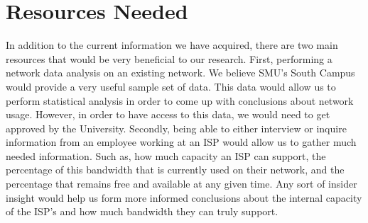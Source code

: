\documentclass{sigcomm-alternate}
\begin{document}
\section{Resources Needed}
In addition to the current information we have acquired, there are two main resources that would be very beneficial to our research. First, performing a network data analysis on an existing network. We believe SMU's South Campus would provide a very useful sample set of data. This data would allow us to perform statistical analysis in order to come up with conclusions about network usage. However, in order to have access to this data, we would need to get approved by the University. Secondly, being able to either interview or inquire information from an employee working at an ISP would allow us to gather much needed information. Such as, how much capacity an ISP can support, the percentage of this bandwidth that is currently used on their network, and the percentage that remains free and available at any given time. Any sort of insider insight would help us form more informed conclusions about the internal capacity of the ISP's and how much bandwidth they can truly support.





\end{document}
